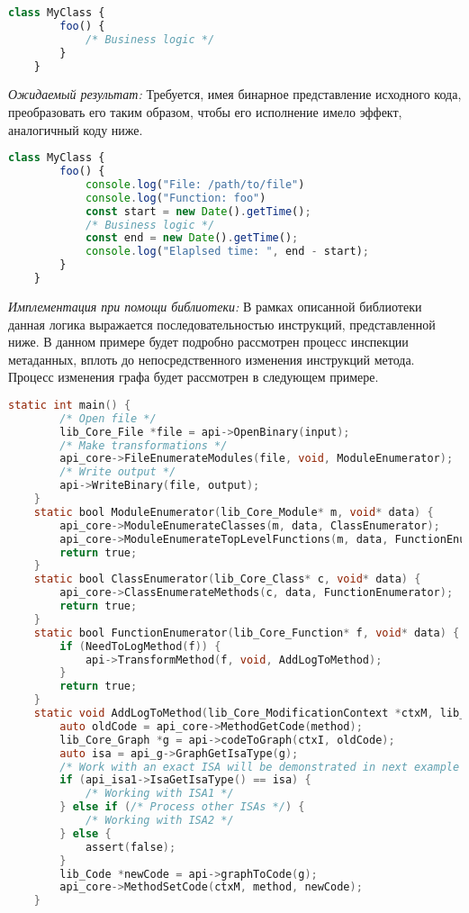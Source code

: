 \begin{lstlisting}[language=javascript, label=lst:]
    class MyClass {
        foo() {
            /* Business logic */
        }
    }
\end{lstlisting}

\textit{Ожидаемый результат:} Требуется, имея бинарное представление исходного кода, преобразовать его таким образом, чтобы его исполнение имело эффект, аналогичный коду ниже.

\begin{lstlisting}[language=javascript, label=lst:]
    class MyClass {
        foo() {
            console.log("File: /path/to/file")
            console.log("Function: foo")
            const start = new Date().getTime();
            /* Business logic */
            const end = new Date().getTime();
            console.log("Elaplsed time: ", end - start);
        }
    }
\end{lstlisting}

\textit{Имплементация при помощи библиотеки:} В рамках описанной библиотеки данная логика выражается последовательностью инструкций, представленной ниже. В данном примере будет подробно рассмотрен процесс инспекции метаданных, вплоть до непосредственного изменения инструкций метода. Процесс изменения графа будет рассмотрен в следующем примере.

\begin{lstlisting}[language=C, label=lst:]
    static int main() {
        /* Open file */
        lib_Core_File *file = api->OpenBinary(input);
        /* Make transformations */
        api_core->FileEnumerateModules(file, void, ModuleEnumerator);
        /* Write output */
        api->WriteBinary(file, output);
    }
    static bool ModuleEnumerator(lib_Core_Module* m, void* data) {
        api_core->ModuleEnumerateClasses(m, data, ClassEnumerator);
        api_core->ModuleEnumerateTopLevelFunctions(m, data, FunctionEnumerator)
        return true;
    }
    static bool ClassEnumerator(lib_Core_Class* c, void* data) {
        api_core->ClassEnumerateMethods(c, data, FunctionEnumerator);
        return true;
    }
    static bool FunctionEnumerator(lib_Core_Function* f, void* data) {
        if (NeedToLogMethod(f)) {
            api->TransformMethod(f, void, AddLogToMethod);
        }
        return true;
    }
    static void AddLogToMethod(lib_Core_ModificationContext *ctxM, lib_Core_Function *f, void *data) {
        auto oldCode = api_core->MethodGetCode(method);
        lib_Core_Graph *g = api->codeToGraph(ctxI, oldCode);
        auto isa = api_g->GraphGetIsaType(g);
        /* Work with an exact ISA will be demonstrated in next example */
        if (api_isa1->IsaGetIsaType() == isa) {
            /* Working with ISA1 */
        } else if (/* Process other ISAs */) {
            /* Working with ISA2 */
        } else {
            assert(false);
        }
        lib_Code *newCode = api->graphToCode(g);
        api_core->MethodSetCode(ctxM, method, newCode);
    }
\end{lstlisting}

